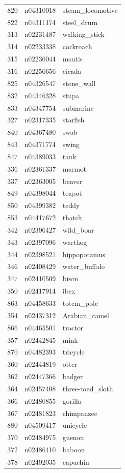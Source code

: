 \begin{table}
\begin{tabular}{cll}
820 & n04310018 & steam_locomotive \\
822 & n04311174 & steel_drum \\
313 & n02231487 & walking_stick \\
314 & n02233338 & cockroach \\
315 & n02236044 & mantis \\
316 & n02256656 & cicada \\
825 & n04326547 & stone_wall \\
832 & n04346328 & stupa \\
833 & n04347754 & submarine \\
327 & n02317335 & starfish \\
840 & n04367480 & swab \\
843 & n04371774 & swing \\
847 & n04389033 & tank \\
336 & n02361337 & marmot \\
337 & n02363005 & beaver \\
849 & n04398044 & teapot \\
850 & n04399382 & teddy \\
853 & n04417672 & thatch \\
342 & n02396427 & wild_boar \\
343 & n02397096 & warthog \\
344 & n02398521 & hippopotamus \\
346 & n02408429 & water_buffalo \\
347 & n02410509 & bison \\
350 & n02417914 & ibex \\
863 & n04458633 & totem_pole \\
354 & n02437312 & Arabian_camel \\
866 & n04465501 & tractor \\
357 & n02442845 & mink \\
870 & n04482393 & tricycle \\
360 & n02444819 & otter \\
362 & n02447366 & badger \\
364 & n02457408 & three-toed_sloth \\
366 & n02480855 & gorilla \\
367 & n02481823 & chimpanzee \\
880 & n04509417 & unicycle \\
370 & n02484975 & guenon \\
372 & n02486410 & baboon \\
378 & n02492035 & capuchin \\

\end{tabular}
\end{table}
